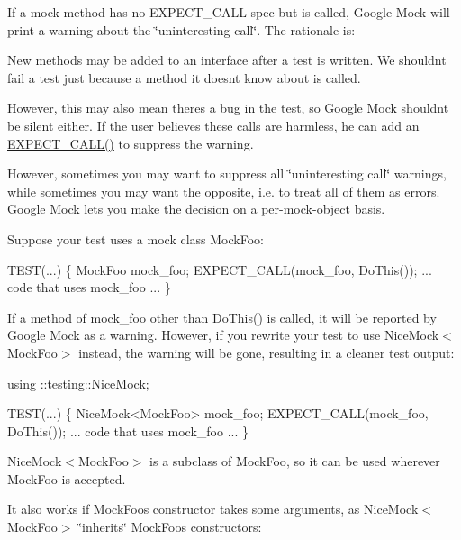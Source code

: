 If a mock method has no {\ttfamily E\+X\+P\+E\+C\+T\+\_\+\+C\+A\+LL} spec but is called, Google Mock will print a warning about the \char`\"{}uninteresting call\char`\"{}. The rationale is\+:


\begin{DoxyItemize}
\item New methods may be added to an interface after a test is written. We shouldn\textquotesingle{}t fail a test just because a method it doesn\textquotesingle{}t know about is called.
\item However, this may also mean there\textquotesingle{}s a bug in the test, so Google Mock shouldn\textquotesingle{}t be silent either. If the user believes these calls are harmless, he can add an {\ttfamily \hyperlink{gmock-spec-builders_8h_a535a6156de72c1a2e25a127e38ee5232}{E\+X\+P\+E\+C\+T\+\_\+\+C\+A\+L\+L()}} to suppress the warning.
\end{DoxyItemize}

However, sometimes you may want to suppress all \char`\"{}uninteresting call\char`\"{} warnings, while sometimes you may want the opposite, i.\+e. to treat all of them as errors. Google Mock lets you make the decision on a per-\/mock-\/object basis.

Suppose your test uses a mock class {\ttfamily Mock\+Foo}\+:


\begin{DoxyCode}
TEST(...) \{
  MockFoo mock\_foo;
  EXPECT\_CALL(mock\_foo, DoThis());
  ... code that uses mock\_foo ...
\}
\end{DoxyCode}


If a method of {\ttfamily mock\+\_\+foo} other than {\ttfamily Do\+This()} is called, it will be reported by Google Mock as a warning. However, if you rewrite your test to use {\ttfamily Nice\+Mock$<$Mock\+Foo$>$} instead, the warning will be gone, resulting in a cleaner test output\+:


\begin{DoxyCode}
using ::testing::NiceMock;

TEST(...) \{
  NiceMock<MockFoo> mock\_foo;
  EXPECT\_CALL(mock\_foo, DoThis());
  ... code that uses mock\_foo ...
\}
\end{DoxyCode}


{\ttfamily Nice\+Mock$<$Mock\+Foo$>$} is a subclass of {\ttfamily Mock\+Foo}, so it can be used wherever {\ttfamily Mock\+Foo} is accepted.

It also works if {\ttfamily Mock\+Foo}\textquotesingle{}s constructor takes some arguments, as {\ttfamily Nice\+Mock$<$Mock\+Foo$>$} \char`\"{}inherits\char`\"{} {\ttfamily Mock\+Foo}\textquotesingle{}s constructors\+:


